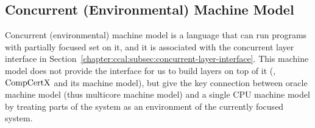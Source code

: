 

\subsection{Concurrent (Environmental) Machine Model}
\label{chapter:linking:subsec:concurrent-machine-model}

Concurrent (environmental) machine model is a language that can run programs with partially focused set on it,
and it is associated with the concurrent layer interface in Section~\ref{chapter:ccal:subsec:concurrent-layer-interface}. 
This machine model does not provide the interface for us to build layers on top of it (\eg, $\mathrm{CompCertX}$ and its machine model), but give the key connection between oracle machine model (thus multicore machine model) and a single CPU machine model
by treating parts of the system as an environment of the currently focused system. 

